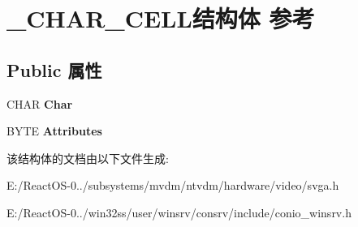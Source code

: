 \hypertarget{struct___c_h_a_r___c_e_l_l}{}\section{\+\_\+\+C\+H\+A\+R\+\_\+\+C\+E\+L\+L结构体 参考}
\label{struct___c_h_a_r___c_e_l_l}
\subsection*{Public 属性}
\begin{DoxyCompactItemize}
\item 
\mbox{\label{struct___c_h_a_r___c_e_l_l_affd4653212cefedbaa5cf543fbb4e8a6}} 
C\+H\+AR {\bfseries Char}
\item 
\mbox{\label{struct___c_h_a_r___c_e_l_l_a8cda1e6e65865ff439b2f76cb3df040a}} 
B\+Y\+TE {\bfseries Attributes}
\end{DoxyCompactItemize}


该结构体的文档由以下文件生成\+:\begin{DoxyCompactItemize}
\item 
E\+:/\+React\+O\+S-\/0../subsystems/mvdm/ntvdm/hardware/video/svga.\+h\item 
E\+:/\+React\+O\+S-\/0../win32ss/user/winsrv/consrv/include/conio\+\_\+winsrv.\+h\end{DoxyCompactItemize}
